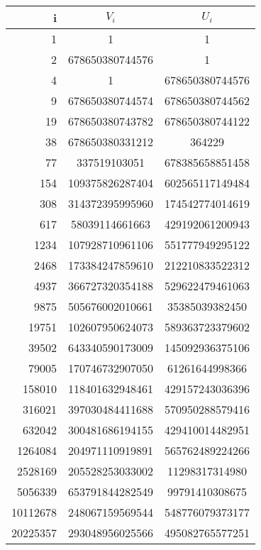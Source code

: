 \begin{enumerate}
		\begin{center}
			\begin{tabular}{ | r | c | c |}
				\hline
				i               & $V_i$        & $U_i$ \\
				\hline
				1               & 1               & 1 \\
				2               & 678650380744576 & 1 \\
				4               & 1               & 678650380744576 \\
				9               & 678650380744574 & 678650380744562 \\
				19              & 678650380743782 & 678650380744122 \\
				38              & 678650380331212 & 364229 \\
				77              & 337519103051    & 678385658851458 \\
				154             & 109375826287404 & 602565117149484 \\
				308             & 314372395995960 & 174542774014619 \\
				617             & 58039114661663  & 429192061200943 \\
				1234            & 107928710961106 & 551777949295122 \\
				2468            & 173384247859610 & 212210833522312 \\
				4937            & 366727320354188 & 529622479461063 \\
				9875            & 505676002010661 & 35385039382450 \\
				19751           & 102607950624073 & 589363723379602 \\
				39502           & 643340590173009 & 145092936375106 \\
				79005           & 170746732907050 & 61261644998366 \\
				158010          & 118401632948461 & 429157243036396 \\
				316021          & 397030484411688 & 570950288579416 \\
				632042          & 300481686194155 & 429410014482951 \\
				1264084         & 204971110919891 & 565762489224266 \\
				2528169         & 205528253033002 & 11298317314980 \\
				5056339         & 653791844282549 & 99791410308675 \\
				10112678        & 248067159569544 & 548776079373177 \\
				20225357        & 293048956025566 & 495082765577251 \\

\end{tabular}
\end{center}
\end{enumerate}
